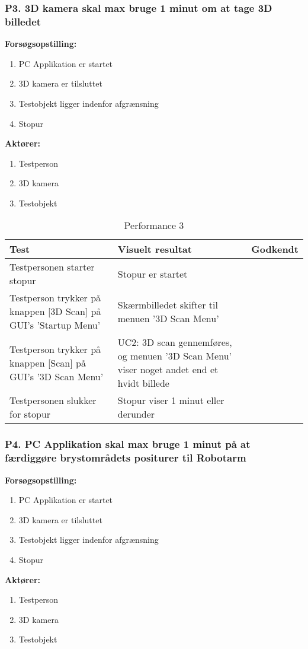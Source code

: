 \subsubsection{P3. 3D kamera skal max bruge 1 minut om at tage 3D billedet}
\textbf{Forsøgsopstilling:}
\begin{enumerate}
\item PC Applikation er startet
\item 3D kamera er tilsluttet
\item Testobjekt ligger indenfor afgrænsning
\item Stopur
\end{enumerate}
\textbf{Aktører:}
\begin{enumerate}
\item Testperson
\item 3D kamera 
\item Testobjekt
\end{enumerate}

\begin{table}[htb]
\begin{tabularx}{\textwidth}{|X|X|p{2cm}|}
\hline
\textbf{Test} & \textbf{Visuelt resultat} &\textbf{Godkendt}\\\hline  
Testpersonen starter stopur & Stopur er startet & \\ \hline
Testperson trykker på knappen [3D Scan] på GUI's 'Startup Menu' & Skærmbilledet skifter til menuen '3D Scan Menu' &  \\\hline
Testperson trykker på knappen [Scan] på GUI's '3D Scan Menu' & UC2: 3D scan gennemføres, og menuen '3D Scan Menu' viser noget andet end et hvidt billede & \\\hline
Testpersonen slukker for stopur & Stopur viser 1 minut eller derunder & \\\hline
\end{tabularx}
\caption{Performance 3}
\label{P3}
\end{table}
\newpage

\subsubsection{P4. PC Applikation skal max bruge 1 minut på at færdiggøre brystområdets positurer til Robotarm}
\textbf{Forsøgsopstilling:}
\begin{enumerate}
\item PC Applikation er startet
\item 3D kamera er tilsluttet
\item Testobjekt ligger indenfor afgrænsning
\item Stopur
\end{enumerate}
\textbf{Aktører:}
\begin{enumerate}
\item Testperson 
\item 3D kamera 
\item Testobjekt
\end{enumerate}

